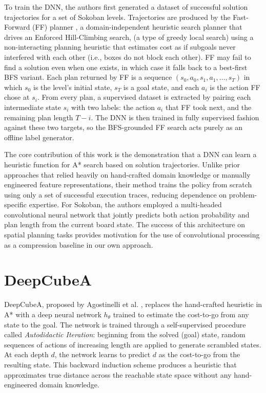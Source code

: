 To train the DNN, the authors first generated a dataset of successful solution trajectories for a set of Sokoban levels. Trajectories are produced by the Fast-Forward (FF) planner \cite{Hoffmann_2001}, a domain-independent heuristic search planner that drives an Enforced Hill-Climbing search, (a type of greedy local search) using a non-interacting planning heuristic that estimates cost as if subgoals never interfered with each other (i.e., boxes do not block each other). FF may fail to find a solution even when one exists, in which case it falls back to a best-first BFS variant. Each plan returned by FF is a sequence $(s_0, a_0, s_1, a_1, \dots, s_T)$ in which $s_0$ is the level's initial state, $s_T$ is a goal state, and each $a_i$ is the action FF chose at $s_i$. From every plan, a supervised dataset is extracted by pairing each intermediate state $s_i$ with two labels: the action $a_i$ that FF took next, and the remaining plan length $T - i$. The DNN is then trained in fully supervised fashion against these two targets, so the BFS-grounded FF search acts purely as an offline label generator.

The core contribution of this work is the demonstration that a DNN can learn a heuristic function for A* search based on solution trajectories. Unlike prior approaches that relied heavily on hand-crafted domain knowledge or manually engineered feature representations, their method trains the policy from scratch using only a set of successful execution traces, reducing dependence on problem-specific expertise. For Sokoban, the authors employed a multi-headed convolutional neural network that jointly predicts both action probability and plan length from the current board state. The success of this architecture on spatial planning tasks provides motivation for the use of convolutional processing as a compression baseline in our own approach.


\section{DeepCubeA}

DeepCubeA, proposed by Agostinelli et al. \cite{agostinelli2019solving}, replaces the hand-crafted heuristic in A* with a deep neural network $h_\theta$ trained to estimate the cost-to-go from any state to the goal. The network is trained through a self-supervised procedure called \textit{Autodidactic Iteration}: beginning from the solved (goal) state, random sequences of actions of increasing length are applied to generate scrambled states. At each depth $d$, the network learns to predict $d$ as the cost-to-go from the resulting state. This backward induction scheme produces a heuristic that approximates true distance across the reachable state space without any hand-engineered domain knowledge.

